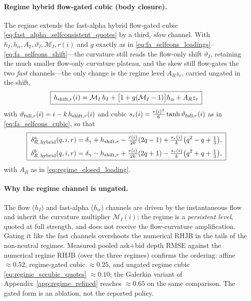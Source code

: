 \documentclass[11pt,a4paper]{article}
\theoremstyle{plain}
\theoremstyle{definition}
\begin{document}
\paragraph{Regime hybrid flow-gated cubic (body closure).}
The regime extends the fast-alpha hybrid flow-gated cubic
\eqref{eq:fast_alpha_selfconsistent_quotes} by a third, \emph{slow} channel.
With \(h_I,h_\alpha,A_2,\vartheta_I,\mathcal M_I,r(i)\) and \(g\) exactly as
in \eqref{eq:fa_selfcons_loadings}--\eqref{eq:fa_selfcons_shift}---the
curvature still reads the flow-only shift \(\vartheta_I\), retaining the much
smaller flow-only curvature plateau, and the skew still flow-gates the two
\emph{fast} channels---the only change is the regime level \(A_Rz_r\),
carried ungated in the shift,
\begin{equation}
\boxed{\,h_{{\rm shift},r}(i)=\mathcal M_I\,h_I
+\bigl[1+g(\mathcal M_I-1)\bigr]h_\alpha+A_R z_r\,}
\label{eq:regime_sc_shift}
\end{equation}
with \(\vartheta_{{\rm full},r}(i)=i-k\,h_{{\rm shift},r}(i)\) and cubic
\(s_r(i)=\tfrac{r(i)^2}{6}\tanh\vartheta_{{\rm full},r}(i)\) as in
\eqref{eq:fa_selfcons_cubic}, so that
\begin{equation}
\boxed{\;
\begin{aligned}
\delta_{R,\,\text{hybrid}}^a(q,i,r)&=\delta_\gamma+h_{{\rm shift},r}-\tfrac{r(i)}{2k}(2q-1)+\tfrac{s_r(i)}{k}\bigl(q^2-q+\tfrac13\bigr),\\[2pt]
\delta_{R,\,\text{hybrid}}^b(q,i,r)&=\delta_\gamma-h_{{\rm shift},r}+\tfrac{r(i)}{2k}(2q+1)-\tfrac{s_r(i)}{k}\bigl(q^2+q+\tfrac13\bigr),
\end{aligned}\;}
\label{eq:regime_sccubic_quotes}
\end{equation}
with \(A_R\) as in \eqref{eq:regime_closed_loading}.

\paragraph{Why the regime channel is ungated.}
The flow (\(h_I\)) and fast-alpha (\(h_\alpha\)) channels are driven by the
instantaneous flow and inherit the curvature multiplier \(\mathcal M_I(i)\); the regime is
a \emph{persistent level}, quoted at full strength, and does not receive the
flow-curvature amplification.  Gating it like the fast channels overshoots the
numerical RHJB in the tails of the non-neutral regimes.  Measured pooled
ask\(+\)bid depth RMSE against the numerical regime RHJB (over the three
regimes) confirms the ordering: affine \(\approx0.52\), regime-gated cubic
\(\approx0.25\), and ungated regime cubic \eqref{eq:regime_sccubic_quotes}
\(\approx0.10\); the Galerkin variant of Appendix~\ref{app:regime_refined}
reaches \(\approx0.65\) on the same comparison.  The gated form is an
ablation, not the reported policy.
\end{document}
